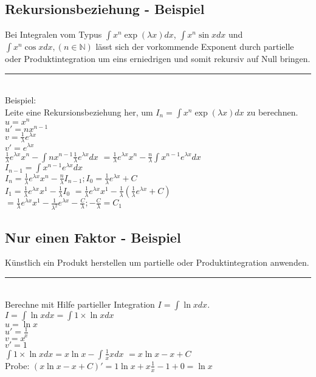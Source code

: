 \documentclass[../main.tex]{subfiles}
\begin{document}
\subsection{Rekursionsbeziehung - Beispiel}
Bei Integralen vom Typus $\int x^n \exp (\lambda x)dx$, $\int x^n \sin x dx$ und
$\int x^n \cos x dx, (n \in \mathbb{N})$ lässt sich der vorkommende Exponent
durch partielle oder Produktintegration um eins erniedrigen und somit rekursiv
auf Null bringen. \\
\noindent\rule{8cm}{0.4pt} \\
Beispiel: \\
Leite eine Rekursionsbeziehung her, um $I_n = \int x^n \exp (\lambda x)dx$ zu berechnen. \\
$u=x^n$ \\
$u'=nx^{n-1}$ \\
$v=\frac{1}{\lambda}e^{\lambda x}$ \\
$v'=e^{\lambda x}$ \\ [7pt]
$\frac{1}{\lambda}e^{\lambda x}x^n - \int nx^{n-1}\frac{1}{\lambda}e^{\lambda x}dx$
$ = \frac{1}{\lambda}e^{\lambda x}x^n - \frac{n}{\lambda} \int x^{n-1}e^{\lambda x}dx$ \\[7pt]
$ I_{n-1} = \int x^{n-1}e^{\lambda x}dx$ \\[7pt]
$ I_n = \frac{1}{\lambda}e^{\lambda x}x^n - \frac{n}{\lambda}I_{n-1}; I_0 = \frac{1}{\lambda}e^{\lambda x} +C$ \\[7pt]
$I_1 = \frac{1}{\lambda}e^{\lambda x}x^1 - \frac{1}{\lambda}I_0$
$ = \frac{1}{\lambda}e^{\lambda x}x^1 - \frac{1}{\lambda}(\frac{1}{\lambda}e^{\lambda x} +C)$ \\
$ = \frac{1}{\lambda}e^{\lambda x}x^1 - \frac{1}{\lambda ^2}e^{\lambda x} - \frac{C}{\lambda}; -\frac{C}{\lambda} = C_1$ 

\subsection{Nur einen Faktor - Beispiel}
Künstlich ein Produkt herstellen um partielle oder Produktintegration anwenden. \\
\noindent\rule{8cm}{0.4pt} \\
Berechne mit Hilfe partieller Integration $I=\int \ln x dx$. \\
$I=\int \ln x dx =\int 1 \times \ln x dx$ \\
$u = \ln x$ \\
$u' = \frac{1}{x}$ \\
$v = x$ \\
$v'=1$ \\
$\int 1 \times \ln x dx = x\ln x - \int \frac{1}{x}xdx$
$ = x\ln x - x + C$ \\
Probe: $(x\ln x - x + C)' = 1 \ln x +x\frac{1}{x}-1+0=\ln x$
\end{document}

